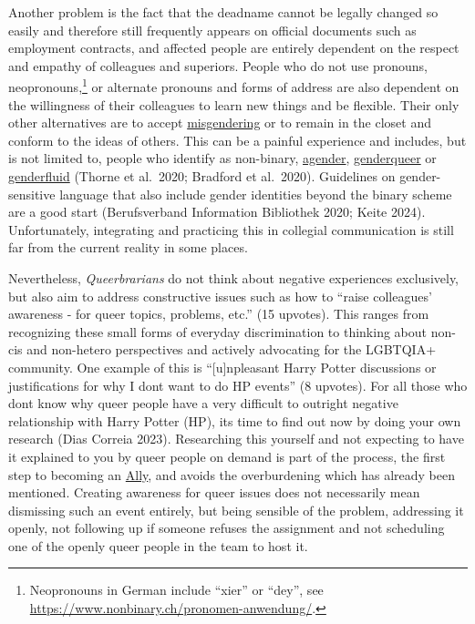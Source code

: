 \documentclass[a4paper,
fontsize=11pt,
oneside,
numbers=noperiodatend,
parskip=half-,
bibliography=totoc,
final
]{scrartcl}
\begin{document}
Another problem is the fact that the deadname cannot be legally changed
so easily and therefore still frequently appears on official documents
such as employment contracts, and affected people are entirely dependent
on the respect and empathy of colleagues and superiors. People who do
not use pronouns, neopronouns,\footnote{Neopronouns in German include
  \enquote{xier} or \enquote{dey}, see
  \url{https://www.nonbinary.ch/pronomen-anwendung/}.} or alternate
pronouns and forms of address are also dependent on the willingness of
their colleagues to learn new things and be flexible. Their only other
alternatives are to accept
\href{https://lgbtqia.fandom.com/wiki/Misgendering}{misgendering} or to
remain in the closet and conform to the ideas of others. This can be a
painful experience and includes, but is not limited to, people who
identify as non-binary,
\href{https://lgbtqia.fandom.com/wiki/Agender}{agender},
\href{https://lgbtqia.fandom.com/wiki/Genderqueer}{genderqueer} or
\href{https://lgbtqia.fandom.com/wiki/Genderfluid}{genderfluid} (Thorne
et al.~2020; Bradford et al.~2020). Guidelines on gender-sensitive
language that also include gender identities beyond the binary scheme
are a good start (Berufsverband Information Bibliothek 2020; Keite
2024). Unfortunately, integrating and practicing this in collegial
communication is still far from the current reality in some places.

Nevertheless, \emph{Queerbrarians} do not think about negative
experiences exclusively, but also aim to address constructive issues
such as how to \enquote{raise colleagues' awareness - for queer topics,
problems, etc.} (15 upvotes). This ranges from recognizing these small
forms of everyday discrimination to thinking about non-cis and
non-hetero perspectives and actively advocating for the LGBTQIA+
community. One example of this is \enquote{{[}u{]}npleasant Harry Potter
discussions or justifications for why I don\textquotesingle t want to do
HP events} (8 upvotes). For all those who don\textquotesingle t know why
queer people have a very difficult to outright negative relationship
with Harry Potter (HP), it\textquotesingle s time to find out now by
doing your own research (Dias Correia 2023). Researching this yourself
and not expecting to have it explained to you by queer people on demand
is part of the process, the first step to becoming an
\href{https://lgbtqia.mywikis.wiki/wiki/Ally}{Ally}, and avoids the
overburdening which has already been mentioned. Creating awareness for
queer issues does not necessarily mean dismissing such an event
entirely, but being sensible of the problem, addressing it openly, not
following up if someone refuses the assignment and not scheduling one of
the openly queer people in the team to host it.
\end{document}
